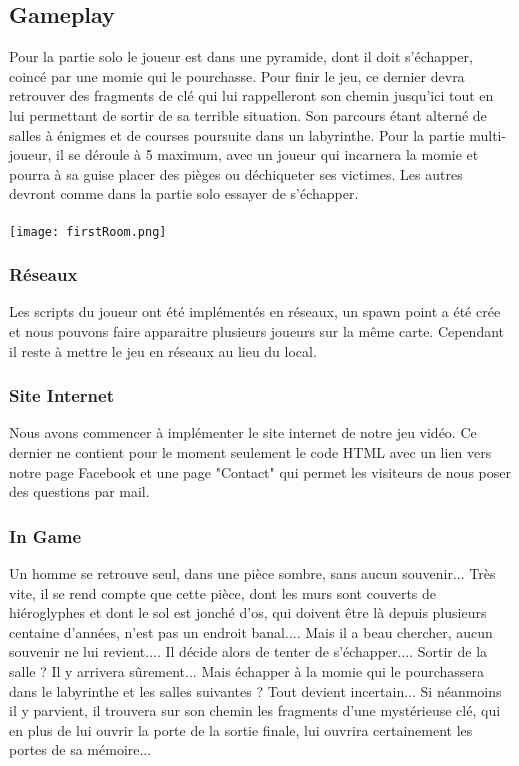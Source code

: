 \documentclass[12pt,a4paper]{article}
\begin{document}
\newpage
\subsection{Gameplay}
Pour la partie solo le joueur est dans une pyramide, dont il doit s'échapper, coincé par une momie qui le pourchasse. Pour finir le jeu, ce dernier devra retrouver des fragments de clé qui lui rappelleront son chemin jusqu'ici tout en lui permettant de sortir de sa terrible situation. Son parcours étant alterné de salles à énigmes et de courses poursuite dans un labyrinthe.
Pour la partie multi-joueur, il se déroule à 5 maximum, avec un joueur qui incarnera la momie et pourra à sa guise placer des pièges ou déchiqueter ses victimes.
Les autres devront comme dans la partie solo essayer de s'échapper.
\paragraph{}
\texttt{[image: firstRoom.png]}
\newpage
\subsubsection{Réseaux}
Les scripts du joueur ont été implémentés en réseaux, un spawn point a été crée et nous pouvons faire apparaitre plusieurs joueurs sur la même carte. Cependant il reste à mettre le jeu en réseaux au lieu du local.  
\subsubsection{Site Internet}
Nous avons commencer à implémenter le site internet de notre jeu vidéo. Ce dernier ne contient pour le moment seulement le code HTML avec un lien vers notre page Facebook et une page "Contact" qui permet les visiteurs de nous poser des questions par mail.
\newpage
\subsubsection{In Game}
Un homme se retrouve seul, dans une pièce sombre, sans aucun souvenir...
Très vite, il se rend compte que cette pièce, dont les murs sont couverts de hiéroglyphes et dont le sol est jonché d'os, qui doivent être là depuis plusieurs centaine d'années, n'est pas un endroit banal....
Mais il a beau chercher, aucun souvenir ne lui revient....
Il décide alors de tenter de s'échapper....
Sortir de la salle ? Il y arrivera sûrement... Mais échapper à la momie qui le pourchassera dans le labyrinthe et les salles suivantes ? Tout devient incertain...
Si néanmoins il y parvient, il trouvera sur son chemin les fragments d'une mystérieuse clé, qui en plus de lui ouvrir la porte de la sortie finale, lui ouvrira certainement les portes de sa mémoire...
\end{document}
